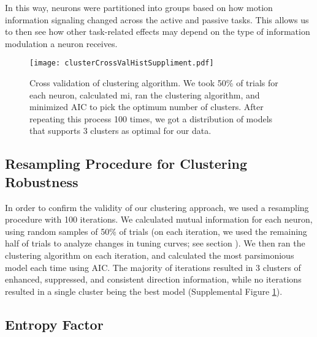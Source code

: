 In this way, neurons were partitioned into groups based on how motion information signaling changed across the active and passive tasks. This allows us to then see how other task-related effects may depend on the type of information modulation a neuron receives.


	\setcounter{scratchcounter}{\value{figure}}
	\setcounter{figure}{\thesupplementcounter}
	\renewcommand{\figurename}{Supplemental Figure}
	\begin{figure}
		\centering
		\texttt{[image: clusterCrossValHistSuppliment.pdf]}
		\caption{Cross validation of clustering algorithm. We took 50\% of trials for each neuron, calculated \gls{mi}, ran the clustering algorithm, and minimized AIC to pick the optimum number of clusters. After repeating this process 100 times, we got a distribution of models that supports 3 clusters as optimal for our data.}
		\label{fig:suppXval} %
	\end{figure}
	\setcounter{supplementcounter}{\value{figure}}
	\setcounter{figure}{\thescratchcounter}
	\renewcommand{\figurename}{Figure}
	\addtocounter{page}{-1}
	\thispagestyle{empty}
	\clearpage


\subsection*{Resampling Procedure for Clustering Robustness}\label{sec:resampling}
\newcommand{\revXval}{ %
	In order to confirm the validity of our clustering approach, we used a resampling procedure with 100 iterations. We calculated mutual information for each neuron, using random samples of 50\% of trials (on each iteration, we used the remaining half of trials to analyze changes in tuning curves; see section \emph{\nameref{sec:tuning}}). We then ran the clustering algorithm on each iteration, and calculated the most parsimonious model each time using AIC. The majority of iterations resulted in 3 clusters of enhanced, suppressed, and consistent direction information, while no iterations resulted in a single cluster being the best model (Supplemental Figure \ref{fig:suppXval}).
}\revXval\label{rev:xVal1}

\subsection*{Entropy Factor} 


